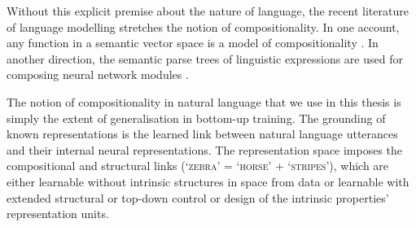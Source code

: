 Without this explicit premise about the nature of language, the recent literature of language modelling stretches the notion of compositionality. 
In one account, any function in a semantic vector space is a model of compositionality \citep{mitchell2010composition}. 
In another direction, the semantic parse trees of linguistic expressions are used for composing neural network modules \citep{andreas2016neural}.

The notion of compositionality in natural language that we use in this thesis is simply the extent of generalisation in bottom-up training. 
The grounding of known representations is the learned link between natural language utterances and their internal neural representations.
The representation space imposes the compositional and structural links (\textsc{`zebra'} = \textsc{`horse'} + \textsc{`stripes'}), which are either learnable without intrinsic structures in space from data or learnable with extended structural or top-down control or design of the intrinsic properties’ representation units.



